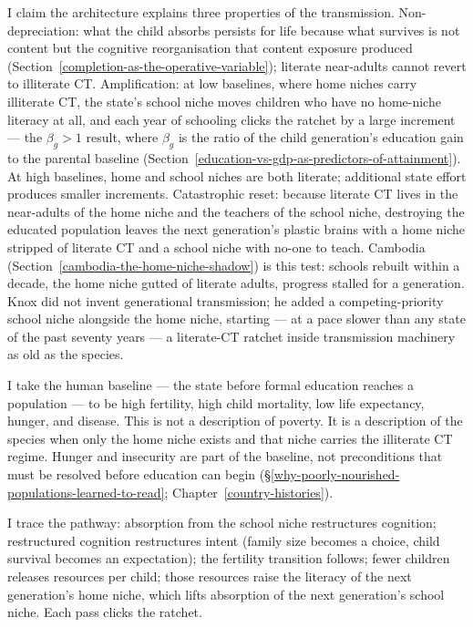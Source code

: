 \documentclass[12pt,letterpaper]{article}
\begin{document}
I claim the architecture explains three properties of the transmission.
Non-depreciation: what the child absorbs persists for life because
what survives is not content but the cognitive reorganisation that
content exposure produced (Section~\ref{completion-as-the-operative-variable});
literate near-adults cannot revert to illiterate CT.
Amplification: at low baselines, where home niches carry illiterate
CT, the state's school niche moves children who have no home-niche
literacy at all, and each year of schooling clicks the ratchet by a
large increment --- the $\beta_g > 1$ result, where $\beta_g$ is the
ratio of the child generation's education gain to the parental
baseline (Section~\ref{education-vs-gdp-as-predictors-of-attainment}).
At high baselines, home and school niches are both literate;
additional state effort produces smaller increments. Catastrophic
reset: because literate CT lives in the near-adults of the home niche
and the teachers of the school niche, destroying the educated
population leaves the next generation's plastic brains with a home
niche stripped of literate CT and a school niche with no-one to
teach. Cambodia (Section~\ref{cambodia-the-home-niche-shadow}) is this test:
schools rebuilt within a decade, the home niche gutted of literate
adults, progress stalled for a generation. Knox did not invent
generational transmission; he added a competing-priority school
niche alongside the home niche, starting --- at a pace slower
than any state of the past seventy years --- a literate-CT ratchet
inside transmission machinery as old as the species.

I take the human baseline --- the state before formal education
reaches a population --- to be high fertility, high child mortality,
low life expectancy, hunger, and disease. This is not a description
of poverty. It is a description of the species when only the home niche
exists and that niche carries the illiterate CT regime. Hunger and
insecurity are part of the baseline, not preconditions that must be
resolved before education can begin
(\S\ref{why-poorly-nourished-populations-learned-to-read};
Chapter~\ref{country-histories}).

I trace the pathway: absorption from the school niche restructures
cognition; restructured cognition restructures intent (family size
becomes a choice, child survival becomes an expectation); the
fertility transition follows; fewer children releases resources per
child; those resources raise the literacy of the next generation's
home niche, which lifts absorption of the next generation's school
niche. Each pass clicks the ratchet.
\end{document}
